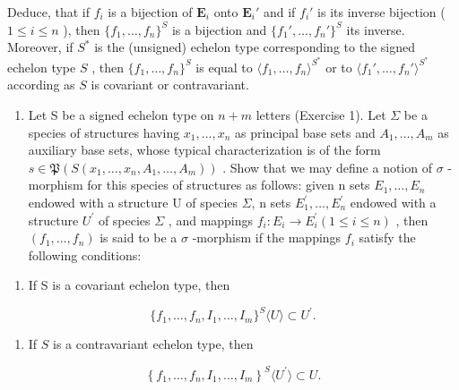 Deduce, that if \(f_i\) is a bijection of \(\mathbf{E}_i\) onto \(\mathbf{E}_i'\) and if \(f_i'\) is its inverse bijection ( \(1 \leqslant i \leqslant n\) ), then \(\{f_1, \ldots, f_n\}^S\) is a bijection and \(\{f_1', \ldots, f_n'\}^S\) its inverse. Moreover, if \(S^*\) is the (unsigned) echelon type corresponding to the signed echelon type \(S\) , then \(\{f_1, \ldots, f_n\}^S\) is equal to \(\langle f_1, \ldots, f_n \rangle^{S^*}\) or to \(\langle f_1', \ldots, f_n' \rangle^{S^*}\) according as \(S\) is covariant or contravariant.

\begin{enumerate}
\def\labelenumi{\arabic{enumi}.}
\setcounter{enumi}{1}
\tightlist
\item
  Let S be a signed echelon type on \(n + m\) letters (Exercise 1). Let \(\Sigma\) be a species of structures having \(x_{1}, \ldots, x_{n}\) as principal base sets and \(A_{1}, \ldots, A_{m}\) as auxiliary base sets, whose typical characterization is of the form \(s \in \mathfrak{P}(S(x_{1}, \ldots, x_{n}, A_{1}, \ldots, A_{m}))\) . Show that we may define a notion of \(\sigma\) -morphism for this species of structures as follows: given n sets \(E_{1}, \ldots, E_{n}\) endowed with a structure U of species \(\Sigma\), n sets \(E_{1}^{\prime}, \ldots, E_{n}^{\prime}\) endowed with a structure \(U^{\prime}\) of species \(\Sigma\) , and mappings \(f_{i}: E_{i} \to E_{i}^{\prime} (1 \leqslant i \leqslant n)\) , then \((f_{1}, \ldots, f_{n})\) is said to be a \(\sigma\) -morphism if the mappings \(f_{i}\) satisfy the following conditions:
\end{enumerate}

\begin{enumerate}
\def\labelenumi{(\roman{enumi})}
\tightlist
\item
  If S is a covariant echelon type, then
\end{enumerate}

\[
\{f _ {1}, \dots , f _ {n}, I _ {1}, \dots , I _ {m} \} ^ {S} \langle U \rangle \subset U ^ {\prime}.
\]

\begin{enumerate}
\def\labelenumi{(\roman{enumi})}
\setcounter{enumi}{1}
\tightlist
\item
  If \(S\) is a contravariant echelon type, then
\end{enumerate}

\[
\left\{f _ {1}, \dots , f _ {n}, I _ {1}, \dots , I _ {m} \right\} ^ {S} \langle U ^ {\prime} \rangle \subset U.
\]

